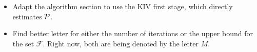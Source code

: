 {\begin{itemize}
        \item Adapt the algorithm section to use the KIV first stage, which directly estimates $ \mathcal{P} $.

        \item Find better letter for either the number of iterations or the upper bound for the set $ \mathcal{F} $.
            Right now, both are being denoted by the letter $ M $.
    \end{itemize}
}
